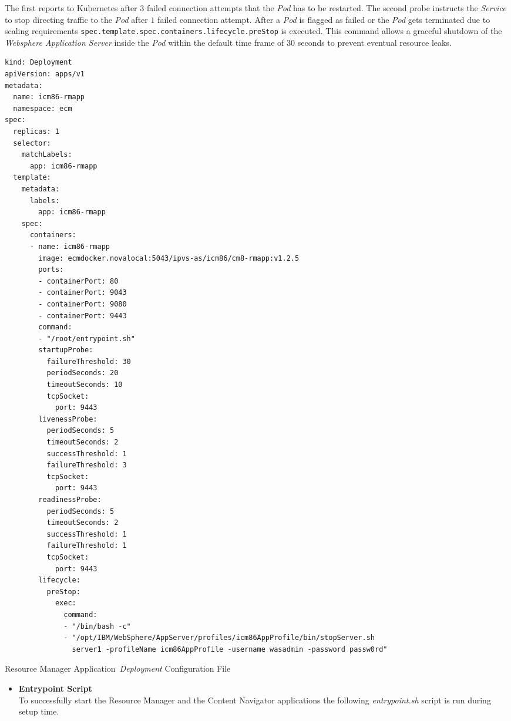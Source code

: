 \begin{itemize}
{    The first reports to Kubernetes after $3$ failed connection attempts that the \textit{Pod} has to be restarted.
    The second probe instructs the \textit{Service} to stop directing traffic to the \textit{Pod} after $1$ failed connection attempt.
    After a \textit{Pod} is flagged as failed or the \textit{Pod} gets terminated due to scaling requirements \texttt{spec.template.spec.containers.lifecycle.preStop} is executed.
    This command allows a graceful shutdown of the \textit{Websphere Application Server} inside the \textit{Pod} within the default time frame of $30$ seconds to prevent eventual resource leaks.
\begin{Listing}[h]
\begin{lstlisting}
kind: Deployment
apiVersion: apps/v1
metadata:
  name: icm86-rmapp
  namespace: ecm
spec:
  replicas: 1
  selector:
    matchLabels:
      app: icm86-rmapp
  template:
    metadata:
      labels:
        app: icm86-rmapp
    spec:
      containers:
      - name: icm86-rmapp
        image: ecmdocker.novalocal:5043/ipvs-as/icm86/cm8-rmapp:v1.2.5
        ports:
        - containerPort: 80
        - containerPort: 9043
        - containerPort: 9080
        - containerPort: 9443
        command:
        - "/root/entrypoint.sh"
        startupProbe:
          failureThreshold: 30
          periodSeconds: 20
          timeoutSeconds: 10
          tcpSocket:
            port: 9443
        livenessProbe:
          periodSeconds: 5
          timeoutSeconds: 2
          successThreshold: 1
          failureThreshold: 3
          tcpSocket:
            port: 9443
        readinessProbe:
          periodSeconds: 5
          timeoutSeconds: 2
          successThreshold: 1
          failureThreshold: 1
          tcpSocket:
            port: 9443
        lifecycle:
          preStop:
            exec:
              command:
              - "/bin/bash -c"
              - "/opt/IBM/WebSphere/AppServer/profiles/icm86AppProfile/bin/stopServer.sh 
                server1 -profileName icm86AppProfile -username wasadmin -password passw0rd"
\end{lstlisting}
\caption{Resource Manager Application~\textit{Deployment} Configuration File}
\label{lst:deployment_config}
\end{Listing}
    \begin{itemize}
        \item[] {\textbf{Entrypoint Script}\\
        To successfully start the Resource Manager and the Content Navigator applications the following \textit{entrypoint.sh} script is run during setup time.
}
\end{itemize}}
\end{itemize}

